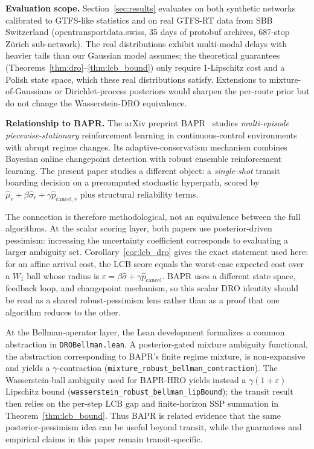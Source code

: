 \documentclass[opre,dblanonrev]{informs4}
\begin{document}
\begin{APPENDICES}
\textbf{Evaluation scope.}
Section~\ref{sec:results} evaluates on both synthetic networks
calibrated to GTFS-like statistics and on real GTFS-RT data from SBB
Switzerland (opentransportdata.swiss, 35 days of protobuf archives,
687-stop Z\"urich sub-network). The real distributions exhibit
multi-modal delays with heavier tails than our Gaussian model
assumes; the theoretical guarantees
(Theorems~\ref{thm:dro}--\ref{thm:lcb_bound}) only require 1-Lipschitz
cost and a Polish state space, which these real distributions
satisfy. Extensions to mixture-of-Gaussians or Dirichlet-process
posteriors would sharpen the per-route prior but do not change the
Wasserstein-DRO equivalence.

\textbf{Relationship to BAPR.}
The arXiv preprint BAPR~\citep{bapr2026} studies
\emph{multi-episode piecewise-stationary} reinforcement learning in
continuous-control environments with abrupt regime changes. Its
adaptive-conservatism mechanism combines Bayesian online changepoint
detection with robust ensemble reinforcement learning. The present
paper studies a different object: a \emph{single-shot} transit
boarding decision on a precomputed stochastic hyperpath, scored by
$\hat\mu_r + \beta\hat\sigma_r + \gamma\hat p_{\mathrm{cancel},r}$
plus structural reliability terms.

The connection is therefore methodological, not an equivalence between
the full algorithms. At the scalar scoring layer, both papers use
posterior-driven pessimism: increasing the uncertainty coefficient
corresponds to evaluating a larger ambiguity set. Corollary~\ref{cor:lcb_dro}
gives the exact statement used here: for an affine arrival cost, the
LCB score equals the worst-case expected cost over a $W_1$ ball whose
radius is $\varepsilon=\beta\hat\sigma+\gamma\hat p_{\mathrm{cancel}}$.
BAPR uses a different state space, feedback loop, and changepoint
mechanism, so this scalar DRO identity should be read as a shared
robust-pessimism lens rather than as a proof that one algorithm reduces
to the other.

At the Bellman-operator layer, the Lean development formalizes a common
abstraction in \texttt{DROBellman.lean}. A posterior-gated mixture
ambiguity functional, the abstraction corresponding to BAPR's finite
regime mixture, is non-expansive and yields a $\gamma$-contraction
(\texttt{mixture\_robust\_bellman\_contraction}). The Wasserstein-ball
ambiguity used for BAPR-HRO yields instead a $\gamma(1+\varepsilon)$
Lipschitz bound
(\texttt{wasserstein\_robust\_bellman\_lipBound}); the transit result
then relies on the per-step LCB gap and finite-horizon SSP summation in
Theorem~\ref{thm:lcb_bound}. Thus BAPR is related evidence that the same
posterior-pessimism idea can be useful beyond transit, while the
guarantees and empirical claims in this paper remain transit-specific.


\end{APPENDICES}
\end{document}
